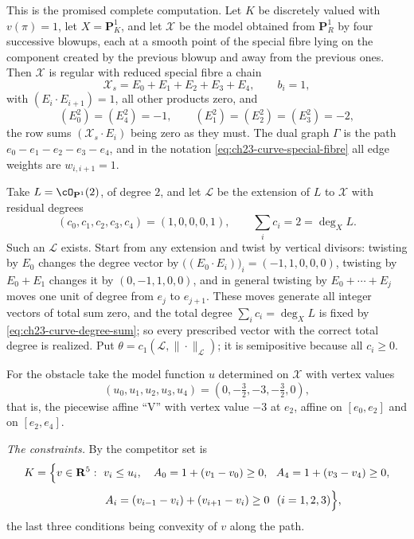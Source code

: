 \begin{example}
\label{ex:ch23-curve-envelope-numbers}
This is the promised complete computation.  Let \(K\) be discretely valued
with \(v(\pi)=1\), let \(X=\mathbf P^1_K\), and let \(\mathcal X\) be the
model obtained from \(\mathbf P^1_R\) by four successive blowups, each at a
smooth point of the special fibre lying on the component created by the
previous blowup and away from the previous ones.  Then \(\mathcal X\) is
regular with reduced special fibre a chain
\[
 \mathcal X_s=E_0+E_1+E_2+E_3+E_4,
 \qquad b_i=1,
\]
with \((E_i\cdot E_{i+1})=1\), all other products zero, and
\[
 (E_0^2)=(E_4^2)=-1,\qquad (E_1^2)=(E_2^2)=(E_3^2)=-2 ,
\]
the row sums \((\mathcal X_s\cdot E_i)\) being zero as they must.  The dual
graph \(\Gamma\) is the path \(e_0-e_1-e_2-e_3-e_4\), and in the notation
\eqref{eq:ch23-curve-special-fibre} all edge weights are
\(w_{i,i+1}=1\).

Take \(L=\cO_{\mathbf P^1}(2)\), of degree \(2\), and let \(\mathcal L\) be
the extension of \(L\) to \(\mathcal X\) with residual degrees
\[
 (c_0,c_1,c_2,c_3,c_4)=(1,0,0,0,1),
 \qquad \sum_ic_i=2=\deg_XL .
\]
Such an \(\mathcal L\) exists.  Start from any extension and twist by
vertical divisors: twisting by \(E_0\) changes the degree vector by
\(\bigl((E_0\cdot E_i)\bigr)_i=(-1,1,0,0,0)\), twisting by \(E_0+E_1\)
changes it by \((0,-1,1,0,0)\), and in general twisting by
\(E_0+\cdots+E_j\) moves one unit of degree from \(e_j\) to \(e_{j+1}\).
These moves generate all integer vectors of total sum zero, and the total
degree \(\sum_ic_i=\deg_XL\) is fixed by
\eqref{eq:ch23-curve-degree-sum}; so every prescribed vector with the
correct total degree is realized.  Put
\(\theta=c_1(\mathcal L,\|\cdot\|_{\mathcal L})\); it is semipositive
because all \(c_i\geq0\).

For the obstacle take the model function \(u\) determined on \(\mathcal X\)
with vertex values
\[
 (u_0,u_1,u_2,u_3,u_4)=(0,-\tfrac32,-3,-\tfrac32,0),
\]
that is, the piecewise affine ``V'' with vertex value \(-3\) at \(e_2\),
affine on \([e_0,e_2]\) and on \([e_2,e_4]\).

\emph{The constraints.}  By
 the competitor set is
\[
 K=\Bigl\{v\in\mathbf R^5:\ v_i\leq u_i,\quad
   A_0=1+(v_1-v_0)\geq0,\ \
   A_4=1+(v_3-v_4)\geq0,
\]
\[
 \phantom{K=\Bigl\{}
   A_i=(v_{i-1}-v_i)+(v_{i+1}-v_i)\geq0\ \ (i=1,2,3)\Bigr\},
\]
the last three conditions being convexity of \(v\) along the path.


\end{example}
